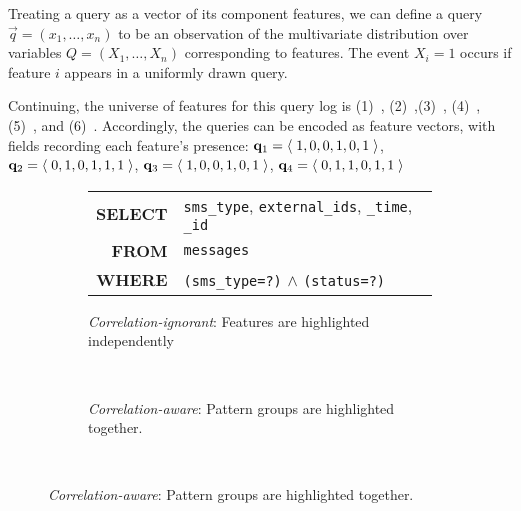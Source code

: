 Treating a query as a vector of its component features, we can define a query $\vec{q}=(x_1,\ldots,x_n)$ to be an observation of the multivariate distribution over variables $Q = (X_1,\ldots,X_n)$ corresponding to features.
The event $X_i = 1$ occurs if feature $i$ appears in a uniformly drawn query.

\begin{example}
Continuing, the universe of features for this query log is (1)~, (2)~,\linebreak (3)~, (4)~, \linebreak (5)~, and (6)~.
Accordingly, the queries can be encoded as feature vectors, with fields recording each feature's presence:
{\small
$\mathbf{q}_1 = \left<\;{1, 0, 0, 1, 0, 1}\;\right>$, 
$\mathbf{q}_2 = \left<\;{0, 1, 0, 1, 1, 1}\;\right>$, 
$\mathbf{q}_3 = \left<\;{1, 0, 0, 1, 0, 1}\;\right>$, 
$\mathbf{q}_4 = \left<\;{0, 1, 1, 0, 1, 1}\;\right>$
}
\end{example}

\begin{figure}
 \centering
\begin{subfigure}{\columnwidth}
  {\small
    \begin{tabular}{rp{60mm}}
    \textbf{SELECT} & 
        \texttt{sms\_type},
        \textcolor{light-gray}{\texttt{external\_ids}},
        \texttt{\_time},
        \texttt{\_id}\\ 
    \textbf{FROM} &
        \texttt{messages}\\ 
    \textbf{WHERE} &
        \textcolor{mid-gray} {\texttt{(sms\_type=?)}} $\wedge$
        \texttt{(status=?)}   
    \end{tabular}
  }
  \caption{\textit{Correlation-ignorant}: Features are highlighted independently}
  \label{fig:screenshots:nocorrelation}
\end{subfigure}\\[2mm]
\begin{subfigure}{\columnwidth}
  {\centering
  }
  \caption{\textit{Correlation-aware}: Pattern groups are highlighted together.
  }
  \label{fig:screenshots:correlation}  
\end{subfigure}\\[2mm]
\label{fig:screenshots}
\trimfigurewhitespace
\end{figure} 

